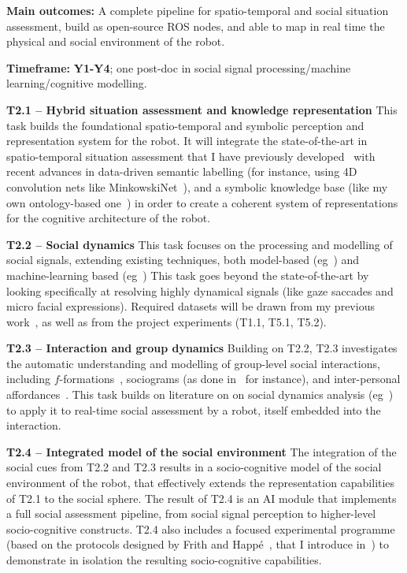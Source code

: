 \documentclass[11pt,a4paper]{report}
\begin{document}
\begin{framed}
    \textbf{Main outcomes:} A complete pipeline for
spatio-temporal and social situation assessment, build as open-source ROS nodes,
and able to map in real time the physical and social environment of the robot.

    \textbf{Timeframe:} \textbf{Y1-Y4}; one post-doc in social
signal processing/machine learning/cognitive modelling.
\end{framed}

\textbf{T2.1 -- Hybrid situation assessment and knowledge representation} This
task builds the foundational spatio-temporal and symbolic perception and
representation system for the robot. It will integrate the state-of-the-art in
spatio-temporal situation assessment that I have previously
developed~\cite{lemaignan2018underworlds, sallami2019simulation} with recent
advances in data-driven semantic labelling (for instance, using 4D convolution
nets like MinkowskiNet~\cite{choy20194d}), and a symbolic knowledge base (like
my own ontology-based one~\cite{lemaignan2010oro}) in order to create a coherent
system of representations for the cognitive architecture of the robot.

\textbf{T2.2 -- Social dynamics} This task focuses on the processing and
modelling of social signals, extending existing techniques, both model-based
(eg~\cite{lemaignan2016realtime,others}) and machine-learning based
(eg~\cite{chetouani,others}) This task goes beyond the state-of-the-art by
looking specifically at resolving highly dynamical signals (like gaze saccades
and micro facial expressions). Required datasets will be drawn from my previous
work~\cite{lemaignan2018pinsoro}, as well as from the project experiments (T1.1,
T5.1, T5.2).

\textbf{T2.3 -- Interaction and group dynamics} Building on T2.2, T2.3
investigates the automatic understanding and modelling of group-level social
interactions, including $f$-formations~\cite{marshall2011using}, sociograms (as
done in~\cite{garcia2016hybrid} for instance), and inter-personal
affordances~\cite{pandey2013affordance}. This task builds on literature on on
social dynamics analysis (eg~\cite{jermann2009physical, martinez2019collocated})
to apply it to real-time social assessment by a robot, itself embedded into the
interaction.

\textbf{T2.4 -- Integrated model of the social environment} The integration of
the social cues from T2.2 and T2.3 results in a socio-cognitive model of the
social environment of the robot, that effectively extends the representation
capabilities of T2.1 to the social sphere. The result of T2.4 is an AI module
that implements a full social assessment pipeline, from social signal perception
to higher-level socio-cognitive constructs. T2.4 also includes a
focused experimental programme (based on the protocols designed by Frith and
Happé~\cite{frith1994autism}, that I introduce in~\cite{lemaignan2015mutual}) to
demonstrate in isolation the resulting socio-cognitive capabilities.
\end{document}
